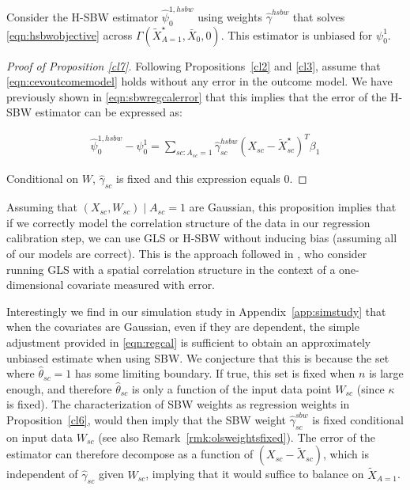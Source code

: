 \begin{proposition}\label{cl7}
    Consider the H-SBW estimator $\hat{\psi}_0^{1, hsbw}$ using weights $\hat{\gamma}^{hsbw}$ that solves \eqref{eqn:hsbwobjective} across $\Gamma(\tilde{X}^\star_{A=1}, \bar{X}_0, 0)$. This estimator is unbiased for $\psi_0^1$.
\end{proposition}

\begin{proof}[Proof of Proposition \ref{cl7}]
    Following Propositions~\ref{cl2} and \ref{cl3}, assume that \eqref{eqn:cevoutcomemodel} holds without any error in the outcome model. We have previously shown in \eqref{eqn:sbwregcalerror} that this implies that the error of the H-SBW estimator can be expressed as:
    
    \begin{align*}
        \hat{\psi}^{1, hsbw}_0 - \psi^1_0 = \sum_{sc: A_{sc} = 1}\hat{\gamma}^{hsbw}_{sc}(X_{sc} - \tilde{X}_{sc}^\star)^T\beta_1
    \end{align*}
    
    Conditional on $W$, $\hat{\gamma}_{sc}$ is fixed and this expression equals 0. 
\end{proof}

\begin{remark}
    Assuming that $(X_{sc}, W_{sc}) \mid A_{sc} = 1$ are Gaussian, this proposition implies that if we correctly model the correlation structure of the data in our regression calibration step, we can use GLS or H-SBW without inducing bias (assuming all of our models are correct). This is the approach followed in \cite{huque2014impact}, who consider running GLS with a spatial correlation structure in the context of a one-dimensional covariate measured with error. 
\end{remark}

\begin{remark}
        Interestingly we find in our simulation study in Appendix~\ref{app:simstudy} that when the covariates are Gaussian, even if they are dependent, the simple adjustment provided in \eqref{eqn:regcal} is sufficient to obtain an approximately unbiased estimate when using SBW. We conjecture that this is because the set where $\hat{\theta}_{sc} = 1$ has some limiting boundary. If true, this set is fixed when $n$ is large enough, and therefore $\hat{\theta}_{sc}$ is only a function of the input data point $W_{sc}$ (since $\kappa$ is fixed). The characterization of SBW weights as regression weights in Proposition~\ref{cl6}, would then imply that the SBW weight $\hat{\gamma}_{sc}^{sbw}$ is fixed conditional on input data $W_{sc}$ (see also Remark~\ref{rmk:olsweightsfixed}). The error of the estimator can therefore decompose as a function of $(X_{sc} - \tilde{X}_{sc})$, which is independent of $\hat{\gamma}_{sc}$ given $W_{sc}$, implying that it would suffice to balance on $\tilde{X}_{A=1}$.
\end{remark}


